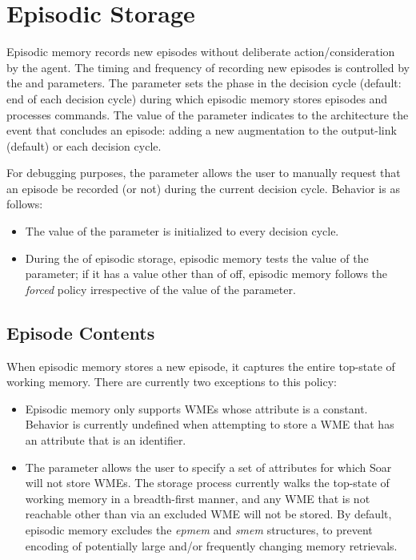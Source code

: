 \section{Episodic Storage}
\label{EPMEM-storage}

Episodic memory records new episodes without deliberate action/consideration by the agent. 
The timing and frequency of recording new episodes is controlled by the  and  parameters.  
The  parameter sets the phase in the decision cycle (default: end of each decision cycle) during which episodic memory stores episodes and processes commands.  
The value of the  parameter indicates to the architecture the event that concludes an episode: adding a new augmentation to the output-link (default) or each decision cycle.

For debugging purposes, the  parameter allows the user to manually request that an episode be recorded (or not) during the current decision cycle.  
Behavior is as follows:

\begin{itemize}
\item 
The value of the  parameter is initialized to  every decision cycle.

\item 
During the  of episodic storage, episodic memory tests the value of the  parameter; if it has a value other than of off, episodic memory follows the \emph{forced} policy irrespective of the value of the  parameter.

\end{itemize}

\subsection{Episode Contents}
When episodic memory stores a new episode, it captures the entire top-state of working memory. 
There are currently two exceptions to this policy:

\begin{itemize}
\item 
Episodic memory only supports WMEs whose attribute is a constant. 
Behavior is currently undefined when attempting to store a WME that has an attribute that is an identifier.

\item 
The  parameter allows the user to specify a set of attributes for which Soar will not store WMEs. 
The storage process currently walks the top-state of working memory in a breadth-first manner, and any WME that is not reachable other than via an excluded WME will not be stored. 
By default, episodic memory excludes the \emph{epmem} and \emph{smem} structures, to prevent encoding of potentially large and/or frequently changing memory retrievals.

\end{itemize}

